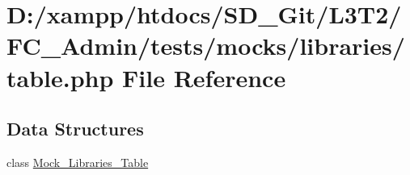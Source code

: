 \hypertarget{tests_2mocks_2libraries_2_table_8php}{}\section{D\+:/xampp/htdocs/\+S\+D\+\_\+\+Git/\+L3\+T2/\+F\+C\+\_\+\+Admin/tests/mocks/libraries/table.php File Reference}
\label{tests_2mocks_2libraries_2_table_8php}
\subsection*{Data Structures}
\begin{DoxyCompactItemize}
\item 
class \hyperlink{class_mock___libraries___table}{Mock\+\_\+\+Libraries\+\_\+\+Table}
\end{DoxyCompactItemize}
